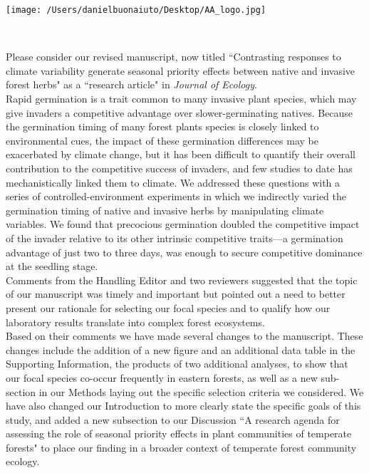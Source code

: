 \documentclass[11 pt]{article}
\begin{document}

\def\labelitemi{--}
\parindent=24pt
\noindent\texttt{[image: /Users/danielbuonaiuto/Desktop/AA\_logo.jpg]}

\\
\vspace{1.5ex}

\noindent Please consider our revised manuscript, now titled ``Contrasting responses to climate variability generate seasonal priority effects between native and invasive forest herbs" as a ``research article" in \textit{Journal of Ecology}.\\

\noindent Rapid germination is  a trait common to many invasive plant species, which may give invaders a competitive advantage over slower-germinating natives. Because the germination timing of many forest plants species is closely linked to environmental cues, the impact of these germination differences may be exacerbated by climate change, but it has been difficult to quantify their overall contribution to the competitive success of invaders, and few studies to date has mechanistically linked them to climate. We addressed these questions with a series of controlled-environment experiments in which we indirectly varied the germination timing of native and invasive herbs by manipulating climate variables. We found that precocious germination doubled the competitive impact of the invader relative to its other intrinsic competitive traits---a germination advantage of just two to three days, was enough to secure competitive dominance at the seedling stage.\\

\noindent Comments from the Handling Editor and two reviewers suggested that the topic of our manuscript was timely and important but pointed out a need to better present our rationale for selecting our focal species and to qualify how our laboratory results translate into complex forest ecosystems.\\

\noindent Based on their comments we have made several changes to the manuscript. These changes include the addition of a new figure and an additional data table in the Supporting Information, the products of two additional analyses, to show that our focal species co-occur frequently in eastern forests, as well as a new sub-section in our Methods laying out the specific selection criteria we considered. We have also changed our Introduction to more clearly state the specific goals of this study, and added a new subsection to our Discussion ``A research agenda for assessing the role of seasonal priority effects in plant communities of temperate forests" to place our finding in a broader context of temperate forest community ecology. \\ 
\end{document}
